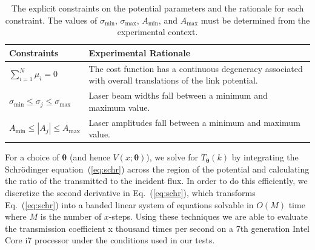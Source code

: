 \documentclass[twocolumn,amsmath,amssymb,showpacs,prl,superscriptaddress,aps]{revtex4-1}
\begin{document}
\begin{table}[t]
  \renewcommand*{\arraystretch}{1.4}
  \begin{tabular}{m{3cm}|m{5.5cm}}
    Constraints & Experimental Rationale \\
    \hline\hline
    $\sum_{i=1}^{N}\mu_i = 0$ & The cost function has a continuous degeneracy associated with overall translations of the link potential. \\
    \hline
    $\sigma_{\mathrm{min}} \leq \sigma_j \leq \sigma_{\mathrm{max}} $ & Laser beam widths fall between a minimum and maximum value.\\
    \hline
    $A_{\mathrm{min}} \leq |A_j| \leq A_{\mathrm{max}}$ & Laser amplitudes fall between a minimum and maximum value.
  \end{tabular}
  \caption{The explicit constraints on the potential parameters and the rationale for each constraint. The values of $\sigma_{\mathrm{min}}$, $\sigma_{\mathrm{max}}$, $A_{\mathrm{min}}$, and $A_{\mathrm{max}}$ must be determined from the experimental context.}
  \label{tab:constraints}
\end{table}



For a choice of $\bm{\theta}$ (and hence $V(x;\bm{\theta})$), we solve for $T_{\bm{\theta}}(k)$ by integrating the Schr{\"o}dinger equation~(\ref{eq:schr}) across the region of the potential and calculating the ratio of the transmitted to the incident flux. In order to do this efficiently, we discretize the second derivative in Eq.~(\ref{eq:schr}), which transforms Eq.~(\ref{eq:schr}) into
a banded linear system of equations solvable in $O(M)$ time where $M$ is the number of $x$-steps. Using these techniques we are able to evaluate the transmission coefficient {\color{red} x} thousand times per second on a 7th generation Intel Core i7 processor under the conditions used in our tests. 
\end{document}
